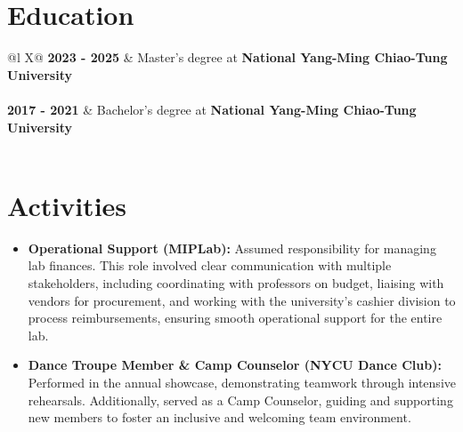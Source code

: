 \documentclass[a4paper,12pt]{article}
\begin{document}
\section{Education}
\begin{tabularx}{\linewidth}{@{}l X@{}}	
\textbf{2023 - 2025} & Master's degree at \textbf{National Yang-Ming Chiao-Tung University} \\%
  \\[3.75pt]

\textbf{2017 - 2021} & Bachelor's degree at \textbf{National Yang-Ming Chiao-Tung University} \\%
  \\ 
\end{tabularx}

\section{Activities}
\begin{itemize}[nosep,after=\strut, leftmargin=1em, itemsep=3pt]
\item \textbf{Operational Support (MIPLab):} Assumed responsibility for managing lab finances. This role involved clear communication with multiple stakeholders, including coordinating with professors on budget, liaising with vendors for procurement, and working with the university's cashier division to process reimbursements, ensuring smooth operational support for the entire lab.
\item \textbf{Dance Troupe Member \& Camp Counselor (NYCU Dance Club):} Performed in the annual showcase, demonstrating teamwork through intensive rehearsals. Additionally, served as a Camp Counselor, guiding and supporting new members to foster an inclusive and welcoming team environment. 
\end{itemize}

\end{document}
